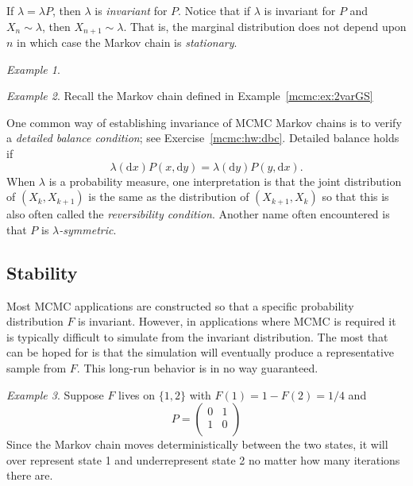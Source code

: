 \documentclass[12pt]{article}
\theoremstyle{plain}
\theoremstyle{definition}
\theoremstyle{remark}
\newtheorem{example}{Example}[section]
\newcommand{\df}{\mathrm{d}}
\begin{document}
If $\lambda = \lambda P$, then $\lambda$ is {\em invariant} for $P$.
Notice that if $\lambda$ is invariant for $P$ and $X_n \sim \lambda$,
then $X_{n+1} \sim \lambda$.  That is, the marginal distribution does
not depend upon $n$ in which case the Markov chain is {\em
  stationary}.

\begin{example}
  \end{example}

\begin{example}
  Recall the Markov chain defined in Example~\eqref{mcmc:ex:2varGS}
\end{example}


One common way of establishing invariance of MCMC Markov chains is to
verify a {\em detailed balance condition}; see
Exercise~\ref{mcmc:hw:dbc}.  Detailed balance holds if
\begin{equation}
   \label{mcmc:eq:dbc}
   \lambda(\df x) P(x, \df y) = \lambda(\df y) P(y, \df x). 
 \end{equation}
 When $\lambda$ is a probability measure, one interpretation is that
 the joint distribution of $(X_k, X_{k+1})$ is the same as the
 distribution of $(X_{k+1}, X_{k})$ so that this is also often called
 the {\em reversibility condition}.  Another name often encountered is
 that $P$ is {\em $\lambda$-symmetric}.

 \subsection{Stability}
 \label{mcmc:sec:stability}
 Most MCMC applications are constructed so that a specific probability
 distribution $F$ is invariant.  However, in applications where MCMC is
 required it is typically difficult to simulate from the invariant
 distribution.  The most that can be hoped for is that the simulation
 will eventually produce a representative sample from $F$.  This
 long-run behavior is in no way guaranteed.

 \begin{example}
   \label{mcmc:ex:detmc}
   Suppose $F$ lives on $\{ 1, 2\}$ with $F(1) = 1 - F(2) = 1/4$ and
   \[
     P = \begin{pmatrix}
       0 & 1 \\
       1 & 0 \\
       \end{pmatrix}
   \]
   Since the Markov chain moves deterministically between the two
   states, it will over represent state 1 and underrepresent state 2
   no matter how many iterations there are.
 \end{example}
 
\end{document}

